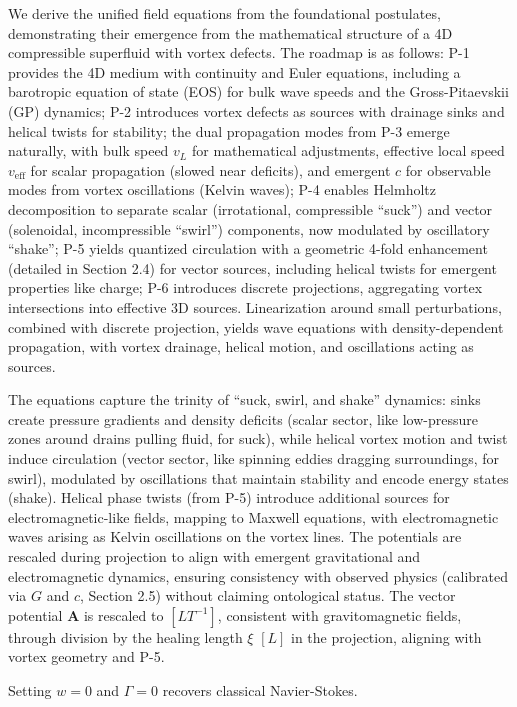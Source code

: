We derive the unified field equations from the foundational postulates, demonstrating their emergence from the mathematical structure of a 4D compressible superfluid with vortex defects. The roadmap is as follows: P-1 provides the 4D medium with continuity and Euler equations, including a barotropic equation of state (EOS) for bulk wave speeds and the Gross-Pitaevskii (GP) dynamics; P-2 introduces vortex defects as sources with drainage sinks and helical twists for stability; the dual propagation modes from P-3 emerge naturally, with bulk speed $v_L$ for mathematical adjustments, effective local speed $v_{\text{eff}}$ for scalar propagation (slowed near deficits), and emergent $c$ for observable modes from vortex oscillations (Kelvin waves); P-4 enables Helmholtz decomposition to separate scalar (irrotational, compressible ``suck'') and vector (solenoidal, incompressible ``swirl'') components, now modulated by oscillatory ``shake''; P-5 yields quantized circulation with a geometric 4-fold enhancement (detailed in Section 2.4) for vector sources, including helical twists for emergent properties like charge; P-6 introduces discrete projections, aggregating vortex intersections into effective 3D sources. Linearization around small perturbations, combined with discrete projection, yields wave equations with density-dependent propagation, with vortex drainage, helical motion, and oscillations acting as sources.

The equations capture the trinity of ``suck, swirl, and shake'' dynamics: sinks create pressure gradients and density deficits (scalar sector, like low-pressure zones around drains pulling fluid, for suck), while helical vortex motion and twist induce circulation (vector sector, like spinning eddies dragging surroundings, for swirl), modulated by oscillations that maintain stability and encode energy states (shake). Helical phase twists (from P-5) introduce additional sources for electromagnetic-like fields, mapping to Maxwell equations, with electromagnetic waves arising as Kelvin oscillations on the vortex lines. The potentials are rescaled during projection to align with emergent gravitational and electromagnetic dynamics, ensuring consistency with observed physics (calibrated via $G$ and $c$, Section 2.5) without claiming ontological status. The vector potential $\mathbf{A}$ is rescaled to $[L T^{-1}]$, consistent with gravitomagnetic fields, through division by the healing length $\xi$ $[L]$ in the projection, aligning with vortex geometry and P-5.

Setting $w=0$ and $\Gamma=0$ recovers classical Navier-Stokes.


